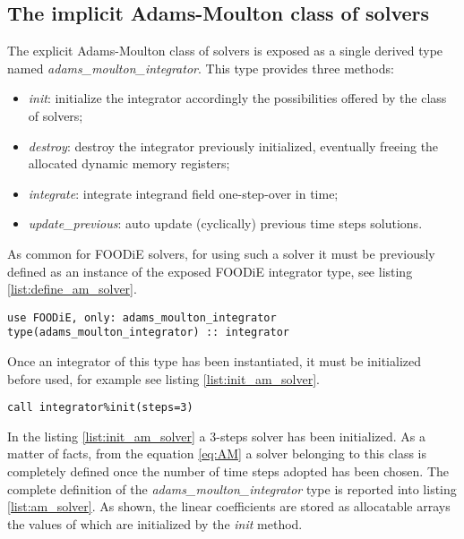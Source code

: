 \documentclass[pdftex,preprint,3p,times,numbers]{elsarticle}
\begin{document}
\subsection{The implicit Adams-Moulton class of solvers}\label{subsec:solver_am}

The explicit Adams-Moulton class of solvers is exposed as a single derived type named \emph{adams\_moulton\_integrator}. This type provides three methods:

\begin{itemize}
  \item \emph{init}: initialize the integrator accordingly the possibilities offered by the class of solvers;
  \item \emph{destroy}: destroy the integrator previously initialized, eventually freeing the allocated dynamic memory registers;
  \item \emph{integrate}: integrate integrand field one-step-over in time;
  \item \emph{update\_previous}: auto update (cyclically) previous time steps solutions.
  \end{itemize}

As common for FOODiE solvers, for using such a solver it must be previously defined as an instance of the exposed FOODiE integrator type, see listing \ref{list:define_am_solver}.

\begin{lstlisting}[firstnumber=1,style=code,caption={definition of an implicit Adams-Moulton integrator},label={list:define_am_solver}]
use FOODiE, only: adams_moulton_integrator
type(adams_moulton_integrator) :: integrator
\end{lstlisting}

Once an integrator of this type has been instantiated, it must be initialized before used, for example see listing \ref{list:init_am_solver}.

\begin{lstlisting}[firstnumber=1,style=code,caption={example of initialization of an implicit Adams-Moulton integrator},label={list:init_am_solver}]
call integrator%init(steps=3)
\end{lstlisting}

In the listing \ref{list:init_am_solver} a 3-steps solver has been initialized. As a matter of facts, from the equation \ref{eq:AM} a solver belonging to this class is completely defined once the number of time steps adopted has been chosen. The complete definition of the \emph{adams\_moulton\_integrator} type is reported into listing \ref{list:am_solver}. As shown, the linear coefficients are stored as allocatable arrays the values of which are initialized by the \emph{init} method.
\end{document}

